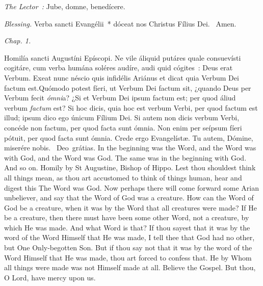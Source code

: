 {{  }

  {
    \bigskip
    \medskip

    \emph{The Lector~:} Jube, domne, benedícere.

    \emph{Blessing.} Verba sancti Evangélii~* dóceat nos Christus Fílius Dei. \Rbar{}~Amen.
  }

  \bigskip{}
  {


  }

  {
    \hspace{10ex}{Lesson IX.}\hfill\emph{Chap. 1.}\hspace{10ex}

    \begin{parcolumns}[rulebetween,colwidths={1=.45\linewidth}]{2}
    {Homilía sancti Augustíni Epíscopi.}%
    {Ne vile áliquid putáres quale consuevísti cogitáre, cum verba humána soléres audíre, audi quid cógites~: Deus erat Verbum. Exeat nunc néscio quis infidélis Ariánus et dicat quia Verbum Dei factum est.}{Quómodo potest fíeri, ut Verbum Dei factum sit, ¿quando Deus per Verbum fecit \emph{ómni}a? ¿Si et Verbum Dei ipsum factum est; per quod áliud verbum \emph{factum} est? Si hoc dicis, quia hoc est verbum Verbi, per quod factum est illud; ipsum dico ego únicum Fílium Dei. Si autem non dicis verbum Verbi, concéde non factum, per quod facta sunt ómnia. Non enim per seípsum fíeri pótuit, per quod facta sunt ómnia. Crede ergo Evangelístæ.
      Tu autem, Dómine, miserére nobis.
      \Rbar{}~Deo~grátias.}%
    {In the beginning was the Word, and the Word was with God, and the Word was God. The same was in the beginning with God. And so on.}%
    {Homily by St Augustine, Bishop of Hippo.}%
    {Lest thou shouldest think all things mean, as thou art accustomed to think of things human, hear and digest this The Word was God. Now perhaps there will come forward some Arian unbeliever, and say that the Word of God was a creature. How can the Word of God be a creature, when it was by the Word that all creatures were made? If He be a creature, then there must have been some other Word, not a creature, by which He was made. And what Word is that? If thou sayest that it was by the word of the Word Himself that He was made, I tell thee that God had no other, but One Only-begotten Son. But if thou say not that it was by the word of the Word Himself that He was made, thou art forced to confess that. He by Whom all things were made was not Himself made at all. Believe the Gospel.
      But thou, O Lord, have mercy upon us.}
    \end{parcolumns}

}}

